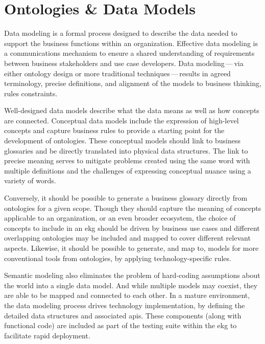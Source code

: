 \section{Ontologies \& Data Models}\label{sec:ekgmm-b-2-2} %

Data modeling is a formal process designed to describe the data needed to support the business functions within
an organization.
Effective data modeling is a communications mechanism to ensure a shared understanding of requirements between
business stakeholders and use case developers.
Data modeling\,---\,via either ontology design or more traditional techniques\,---\,results in agreed terminology,
precise definitions, and alignment of the models to business thinking, rules constraints.

\ekgmmContextSection

Well-designed data models describe what the data means as well as how concepts are connected.
Conceptual data models include the expression of high-level concepts and capture business rules to provide a starting
point for the development of ontologies.
These conceptual models should link to business glossaries and be directly translated into physical data structures.
The link to precise meaning serves to mitigate problems created using the same word with multiple definitions and
the challenges of expressing conceptual nuance using a variety of words.

Conversely, it should be possible to generate a business glossary directly from ontologies for a given scope.
Though they should capture the meaning of concepts applicable to an organization, or an even broader ecosystem,
the choice of concepts to include in an \gls{ekg} should be driven by business use cases and different
overlapping ontologies may be included and mapped to cover different relevant aspects.
Likewise, it should be possible to generate, and map to, models for more conventional tools from ontologies,
by applying technology-specific rules.

Semantic modeling also eliminates the problem of hard-coding assumptions about the world into a single data model.
And while multiple models may coexist, they are able to be mapped and connected to each other.
In a mature environment, the data modeling process drives technology implementation,
by defining the detailed data structures and associated \glspl{api}.
These components (along with functional code) are included as part of the testing suite within the \gls{ekg}
to facilitate rapid deployment.

